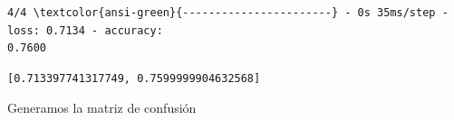 \documentclass[11pt]{article}
\makeatletter
\newcommand{\boxspacing}{\kern\kvtcb@left@rule\kern\kvtcb@boxsep}
\newcommand{\prompt}[4]{
        {\ttfamily\llap{{\color{#2}[#3]:\hspace{3pt}#4}}\vspace{-\baselineskip}}
    }
\makeatother
\begin{document}
\begin{tcolorbox}[breakable, size=fbox, boxrule=1pt, pad at break*=1mm,colback=cellbackground, colframe=cellborder]
    \prompt{Out}{outcolor}{48}{\boxspacing} 
    \begin{Verbatim}[commandchars=\\\{\}]
4/4 \textcolor{ansi-green}{-----------------------} - 0s 35ms/step - loss: 0.7134 - accuracy:
0.7600
    \end{Verbatim}

\begin{Verbatim}[commandchars=\\\{\}]
[0.713397741317749, 0.7599999904632568]
\end{Verbatim}
\end{tcolorbox}
        
    Generamos la matriz de confusión
\end{document}
